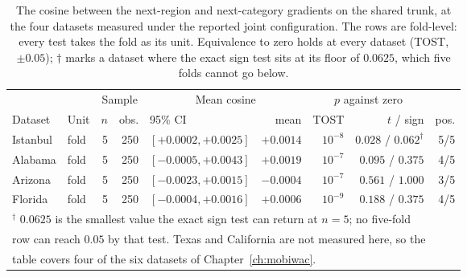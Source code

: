 \begin{table}[htbp]
    \centering
    \caption{The cosine between the next-region and next-category gradients on the shared trunk, at the four datasets measured under the reported joint configuration. The rows are fold-level: every test takes the fold as its unit. Equivalence to zero holds at every dataset (TOST, $\pm 0.05$); $\dagger$ marks a dataset where the exact sign test sits at its floor of $0.0625$, which five folds cannot go below.}
    \label{tab:apx:cosine}
    {\small
    \setlength{\tabcolsep}{4pt}
    \begin{tabular}{llrrlrrrr}
        \toprule
        & & \multicolumn{2}{c}{Sample} & \multicolumn{2}{c}{Mean cosine} & \multicolumn{2}{c}{$p$ against zero} & \\
        \cmidrule(lr){3-4}\cmidrule(lr){5-6}\cmidrule(lr){7-8}
        Dataset & Unit & $n$ & obs. & 95\% CI & mean & TOST & $t$ / sign & pos. \\
        \midrule
        Istanbul   & fold & 5 & 250 & $[+0.0002, +0.0025]$ & $+0.0014$ & $10^{-8}$ & $0.028$ / $0.062^{\dagger}$ & 5/5 \\
        Alabama    & fold & 5 & 250 & $[-0.0005, +0.0043]$ & $+0.0019$ & $10^{-7}$ & $0.095$ / $0.375$ & 4/5 \\
        Arizona    & fold & 5 & 250 & $[-0.0023, +0.0015]$ & $-0.0004$ & $10^{-7}$ & $0.561$ / $1.000$ & 3/5 \\
        Florida    & fold & 5 & 250 & $[-0.0004, +0.0016]$ & $+0.0006$ & $10^{-9}$ & $0.188$ / $0.375$ & 4/5 \\
        \bottomrule
        \multicolumn{9}{l}{\footnotesize $^{\dagger}$ $0.0625$ is the smallest value the exact sign test can return at $n = 5$; no five-fold} \\
        \multicolumn{9}{l}{\footnotesize row can reach $0.05$ by that test. Texas and California are not measured here, so the} \\
        \multicolumn{9}{l}{\footnotesize table covers four of the six datasets of Chapter~\ref{ch:mobiwac}.} \\
    \end{tabular}
    }
\end{table}
